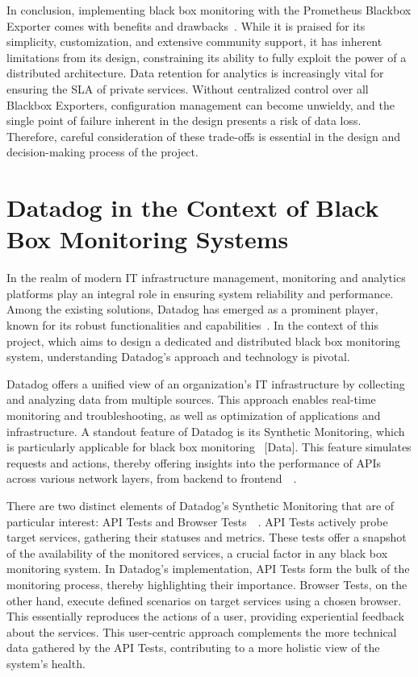 In conclusion, implementing black box monitoring with the Prometheus Blackbox Exporter comes with benefits and drawbacks~\parencite{oreillySpotlightCloudUsing}. While it is praised for its simplicity, customization, and extensive community support, it has inherent limitations from its design, constraining its ability to fully exploit the power of a distributed architecture. Data retention for analytics is increasingly vital for ensuring the \ac{SLA} of private services. Without centralized control over all Blackbox Exporters, configuration management can become unwieldy, and the single point of failure inherent in the design presents a risk of data loss. Therefore, careful consideration of these trade-offs is essential in the design and decision-making process of the project. 

\section{Datadog in the Context of Black Box Monitoring Systems}

In the realm of modern IT infrastructure management, monitoring and analytics platforms play an integral role in ensuring system reliability and performance. Among the existing solutions, Datadog has emerged as a prominent player, known for its robust functionalities and capabilities~\parencite{datadogSyntheticMonitoring}. In the context of this project, which aims to design a dedicated and distributed black box monitoring system, understanding Datadog's approach and technology is pivotal. 

Datadog offers a unified view of an organization's IT infrastructure by collecting and analyzing data from multiple sources. This approach enables real-time monitoring and troubleshooting, as well as optimization of applications and infrastructure. A standout feature of Datadog is its Synthetic Monitoring, which is particularly applicable for black box monitoring~\parencite{datadogSyntheticMonitoring} [Data]. This feature simulates requests and actions, thereby offering insights into the performance of APIs across various network layers, from backend to frontend~\parencite{datadogAPITests}~\parencite{datadogBrowserTests}. 

There are two distinct elements of Datadog's Synthetic Monitoring that are of particular interest: API Tests and Browser Tests~\parencite{datadogAPITests}~\parencite{datadogBrowserTests}. API Tests actively probe target services, gathering their statuses and metrics. These tests offer a snapshot of the availability of the monitored services, a crucial factor in any black box monitoring system. In Datadog's implementation, API Tests form the bulk of the monitoring process, thereby highlighting their importance. Browser Tests, on the other hand, execute defined scenarios on target services using a chosen browser. This essentially reproduces the actions of a user, providing experiential feedback about the services. This user-centric approach complements the more technical data gathered by the API Tests, contributing to a more holistic view of the system's health. 

